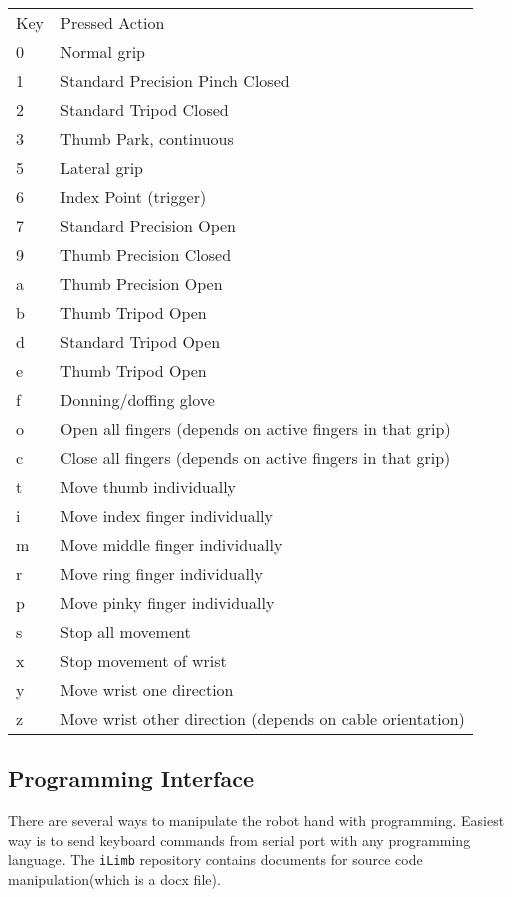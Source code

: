 \documentclass[11pt]{article}
\begin{document}
\begin{center}
\begin{tabular}{ll}
Key & Pressed Action\\
0 & Normal grip\\
1 & Standard Precision Pinch Closed\\
2 & Standard Tripod Closed\\
3 & Thumb Park, continuous\\
5 & Lateral grip\\
6 & Index Point (trigger)\\
7 & Standard Precision Open\\
9 & Thumb Precision Closed\\
a & Thumb Precision Open\\
b & Thumb Tripod Open\\
d & Standard Tripod Open\\
e & Thumb Tripod Open\\
f & Donning/doffing  glove\\
o & Open all fingers (depends on active fingers in that grip)\\
c & Close all fingers (depends on active fingers in that grip)\\
t & Move thumb individually\\
i & Move index finger individually\\
m & Move middle finger individually\\
r & Move ring finger individually\\
p & Move pinky finger individually\\
s & Stop all movement\\
x & Stop movement of wrist\\
y & Move wrist one direction\\
z & Move wrist other direction (depends on cable orientation)\\
\end{tabular}
\end{center}

\subsection{Programming Interface}
\label{sec:orgheadline4}
There are several ways to manipulate the robot hand with programming. Easiest way is to send keyboard commands from serial port with any programming language. The \texttt{iLimb} repository contains documents for source code manipulation(which is a docx file). 
\end{document}
